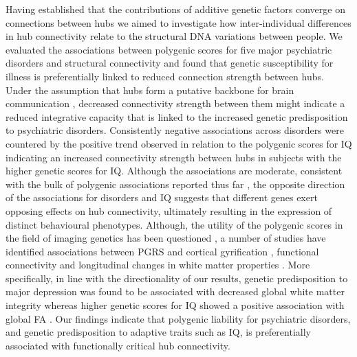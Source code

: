 Having established that the contributions of additive genetic factors converge on connections between hubs we aimed to investigate how inter-individual differences in hub connectivity relate to the structural DNA variations between people. We evaluated the associations between polygenic scores for five major psychiatric disorders and structural connectivity and found that genetic susceptibility for illness is preferentially linked to reduced connection strength between hubs. Under the assumption that hubs form a putative backbone for brain communication \citep{Harriger2012,Towlson2013,VandenHeuvel2011,VandenHeuvel2013b}, decreased connectivity strength between them might indicate a reduced integrative capacity that is linked to the increased genetic predisposition to psychiatric disorders. Consistently negative associations across disorders were countered by the positive trend observed in relation to the polygenic scores for IQ indicating an increased connectivity strength between hubs in subjects with the higher genetic scores for IQ. Although the associations are moderate, consistent with the bulk of polygenic associations reported thus far \citep{Alloza2018,Dezhina2018,Liu2016a,Sadeh2018,Wang2017}, the opposite direction of the associations for disorders and IQ suggests that different genes exert opposing effects on hub connectivity, ultimately resulting in the expression of distinct behavioural phenotypes. Although, the utility of the polygenic scores in the field of imaging genetics has been questioned \citep{Reus2017}, a number of studies have identified associations between PGRS and cortical gyrification \citep{Liu2016a}, functional connectivity \citep{Dezhina2018,Sadeh2018,Wang2017} and longitudinal changes in white matter properties \citep{Alloza2018}. More specifically, in line with the directionality of our results, genetic predisposition to major depression was found to be associated with decreased global white matter integrity \citep{Whalley2013} whereas higher genetic scores for IQ showed a positive association with global FA \citep{Jansen2018}. Our findings indicate that polygenic liability for psychiatric disorders, and genetic predisposition to adaptive traits such as IQ, is preferentially associated with functionally critical hub connectivity.

